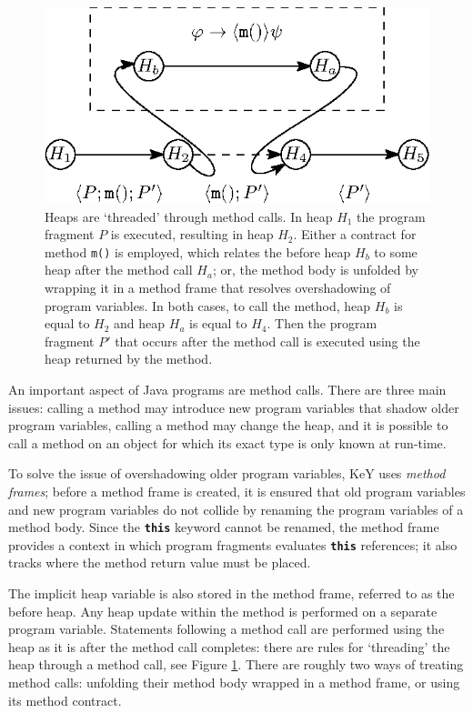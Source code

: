 \begin{figure}
   \centering
   \includegraphics{figures/method_heap.eps}
   \caption{Heaps are `threaded' through method calls. In heap $H_1$ the program fragment $P$ is executed, resulting in heap $H_2$. Either a contract for method \texttt{m()} is employed, which relates the before heap $H_b$ to some heap after the method call $H_a$; or, the method body is unfolded by wrapping it in a method frame that resolves overshadowing of program variables. In both cases, to call the method, heap $H_b$ is equal to $H_2$ and heap $H_a$ is equal to $H_4$. Then the program fragment $P'$ that occurs after the method call is executed using the heap returned by the method.}
   \label{fig:method_heap}
\end{figure}

An important aspect of Java programs are method calls. There are three main issues: calling a method may introduce new program variables that shadow older program variables, calling a method may change the heap, and it is possible to call a method on an object for which its exact type is only known at run-time.

To solve the issue of overshadowing older program variables, KeY uses \emph{method frames}; before a method frame is created, it is ensured that old program variables and new program variables do not collide by renaming the program variables of a method body. Since the \texttt{\textbf{this}} keyword cannot be renamed, the method frame provides a context in which program fragments evaluates \texttt{\textbf{this}} references; it also tracks where the method return value must be placed.

The implicit heap variable is also stored in the method frame, referred to as the before heap. Any heap update within the method is performed on a separate program variable. Statements following a method call are performed using the heap as it is after the method call completes: there are rules for `threading' the heap through a method call, see Figure \ref{fig:method_heap}. There are roughly two ways of treating method calls: unfolding their method body wrapped in a method frame, or using its method contract.

